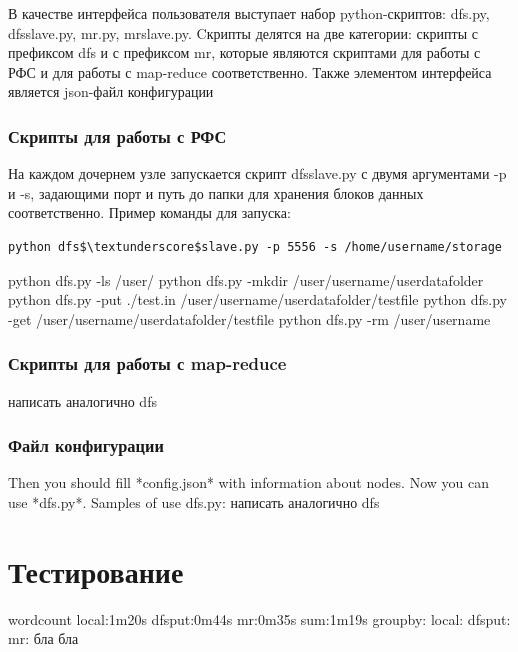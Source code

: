 \documentclass[12pt,a4paper,oneside]{extarticle}
\begin{document}
        В качестве интерфейса пользователя выступает набор python-скриптов: dfs.py, dfs\textunderscore slave.py, mr.py, mr\textunderscore slave.py.
        Cкрипты делятся на две категории: скрипты с префиксом dfs и с префиксом mr, которые являются скриптами для работы с РФС и для работы с map-reduce соответственно.
        Также элементом интерфейса является json-файл конфигурации

        \subsubsection{Скрипты для работы с РФС}
            На каждом дочернем узле запускается скрипт dfs\textunderscore slave.py с двумя аргументами -p и -s, задающими порт и путь до папки для хранения блоков данных соответственно.
            Пример команды для запуска:
            \lstset{}
            \begin{lstlisting}[mathescape] 
    python dfs$\textunderscore$slave.py -p 5556 -s /home/username/storage
            \end{lstlisting}
            


                


            


                python dfs.py -ls /user/
                python dfs.py -mkdir /user/username/userdatafolder
                python dfs.py -put ./test.in /user/username/userdatafolder/testfile
                python dfs.py -get /user/username/userdatafolder/testfile
                python dfs.py -rm /user/username
        \subsubsection{Скрипты для работы с map-reduce}
            написать аналогично dfs

        \subsubsection{Файл конфигурации}
        Then you should fill *config.json* with information about nodes. Now you can use *dfs.py*. Samples of use dfs.py:
            написать аналогично dfs
    \clearpage  


\clearpage

\section{Тестирование}
\label{sec:tests}
    wordcount
        local:1m20s
        dfsput:0m44s
        mr:0m35s
        sum:1m19s
    groupby:
        local:
        dfsput:
        mr:
    бла бла
        
\end{document}

